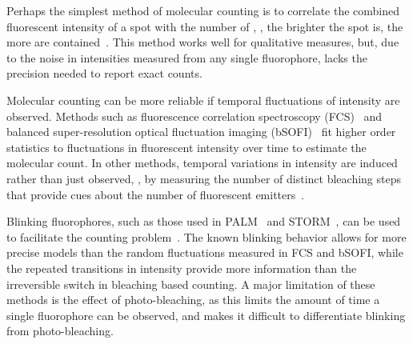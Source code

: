 %
%


%
Perhaps the simplest method of molecular counting is to correlate the combined
fluorescent intensity of a spot with the number of \smallobjects, \ie, the
brighter the spot is, the more \smallobjects are contained~\citep{schmied_2012,
tolar_2005}.
  This method works well for qualitative measures, but, due to the noise in
  intensities measured from any single fluorophore, lacks the precision needed
  to report exact counts.

%
Molecular counting can be more reliable if temporal fluctuations of intensity
are observed.
  Methods such as fluorescence correlation spectroscopy
  (FCS)~\citep{otsuka_2023,wachsmuth_2015,politi_2018} and balanced
  super-resolution optical fluctuation imaging
  (bSOFI)~\citep{geissbuehler_2012} fit higher order statistics to fluctuations
  in fluorescent intensity over time to estimate the molecular count.
  In other methods, temporal variations in intensity are induced rather than
  just observed, \eg, by measuring the number of distinct bleaching
  steps that provide cues about the number of fluorescent
  emitters~\citep{ulbrich_2007,jain_2011,hummert_2021}.

%
Blinking fluorophores, such as those used in
PALM~\citep{sengupta_pcPALM_2011,lee_counting_2012} and
STORM~\citep{patel_blinking_2021}, can be used to facilitate the counting
problem~\citep{rollins_stochastic_2015,nino_2017}.
  The known blinking behavior allows for more precise models than the random
  fluctuations measured in FCS and bSOFI, while the repeated transitions in
  intensity provide more information than the irreversible switch in bleaching
  based counting.
  A major limitation of these methods is the effect of photo-bleaching, as this
  limits the amount of time a single fluorophore can be observed, and makes it
  difficult to differentiate blinking from photo-bleaching.

